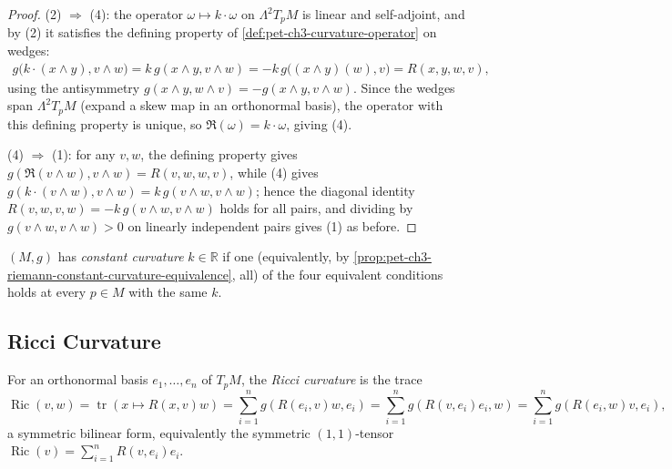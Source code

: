 \begin{proof}
  (2) $\Rightarrow$ (4): the operator $\omega\mapsto k\cdot\omega$ on
  $\Lambda^2T_pM$ is linear and self-adjoint, and by (2) it satisfies the
  defining property of \cref{def:pet-ch3-curvature-operator} on wedges:
  \begin{align*}
    g\big(k\cdot(x\wedge y),v\wedge w\big)
    =k\,g(x\wedge y,v\wedge w)
    =-k\,g\big((x\wedge y)(w),v\big)
    =R(x,y,w,v),
  \end{align*}
  using the antisymmetry $g(x\wedge y,w\wedge v)=-g(x\wedge y,v\wedge w)$.
  Since the wedges span $\Lambda^2T_pM$ (expand a skew map in an orthonormal
  basis), the operator with this defining property is unique, so
  $\mathfrak R(\omega)=k\cdot\omega$, giving (4).

  (4) $\Rightarrow$ (1): for any $v,w$, the defining property gives
  $g(\mathfrak R(v\wedge w),v\wedge w)=R(v,w,w,v)$, while (4) gives
  $g(k\cdot(v\wedge w),v\wedge w)=k\,g(v\wedge w,v\wedge w)$; hence the
  diagonal identity $R(v,w,v,w)=-k\,g(v\wedge w,v\wedge w)$ holds for all
  pairs, and dividing by $g(v\wedge w,v\wedge w)>0$ on linearly independent
  pairs gives (1) as before.
\end{proof}

\begin{definition}
  \label{def:pet-ch3-constant-curvature}
  \leanok
  $(M,g)$ has \emph{constant curvature} $k\in\mathbb R$ if one (equivalently, by
  \cref{prop:pet-ch3-riemann-constant-curvature-equivalence}, all) of the four
  equivalent conditions holds at every $p\in M$ with the same $k$.
\end{definition}

\subsection{Ricci Curvature}

\begin{definition}
  \label{def:pet-ch3-ricci-curvature}
  \leanok
  For an orthonormal basis $e_1,\dots,e_n$ of $T_pM$, the \emph{Ricci curvature} is
  the trace
  \[
    \operatorname{Ric}(v,w)=\operatorname{tr}(x\mapsto R(x,v)w)
    =\sum_{i=1}^ng(R(e_i,v)w,e_i)=\sum_{i=1}^ng(R(v,e_i)e_i,w)
    =\sum_{i=1}^ng(R(e_i,w)v,e_i),
  \]
  a symmetric bilinear form, equivalently the symmetric $(1,1)$-tensor
  $\operatorname{Ric}(v)=\sum_{i=1}^nR(v,e_i)e_i$.
\end{definition}

